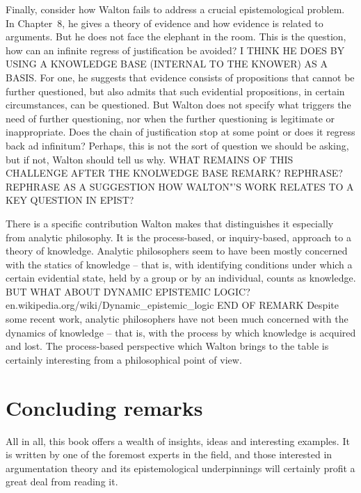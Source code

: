 \documentclass[12pt]{article}
\begin{document}
Finally, consider how Walton fails to address a crucial
epistemological problem. In Chapter~8, he gives a theory of evidence
and how evidence is related to arguments. But he does not face the
elephant in the room. This is the question, how can an infinite
regress of justification be avoided? I THINK HE DOES BY USING A KNOWLEDGE BASE (INTERNAL TO THE KNOWER) AS A BASIS. For one, he suggests that
evidence consists of propositions that cannot be further questioned,
but also admits that such evidential propositions, in certain
circumstances, can be questioned. But Walton does not specify what
triggers the need of further questioning, nor when the further
questioning is legitimate or inappropriate. Does the chain of
justification stop at some point or does it regress back ad infinitum?
Perhaps, this is not the sort of question we should be asking, but if
not, Walton should tell us why.
WHAT REMAINS OF THIS CHALLENGE AFTER THE KNOLWEDGE BASE REMARK? REPHRASE? REPHRASE AS A SUGGESTION HOW WALTON"'S WORK RELATES TO A KEY QUESTION IN EPIST?

There is a specific contribution Walton makes that distinguishes it especially from analytic philosophy. It is the process-based, or
inquiry-based, approach to a theory of knowledge. Analytic
philosophers seem to have been mostly concerned with the statics of knowledge
-- that is, with identifying conditions under which a certain
evidential state, held by a group or by an individual, counts as
knowledge. BUT WHAT ABOUT DYNAMIC EPISTEMIC LOGIC? en.wikipedia.org/wiki/Dynamic\_epistemic\_logic END OF REMARK Despite some recent work, analytic philosophers have not
been much concerned with the dynamics of knowledge -- that is, with
the process by which knowledge is acquired and lost. The process-based
perspective which Walton brings to the table is certainly interesting
from a philosophical point of view.

\section{Concluding remarks}

\noindent All in all, this book offers a wealth of
insights, ideas and interesting examples. It is written by one of the
foremost experts in the field, and those interested in argumentation
theory and its epistemological underpinnings will certainly profit a
great deal from reading it.
\end{document}
